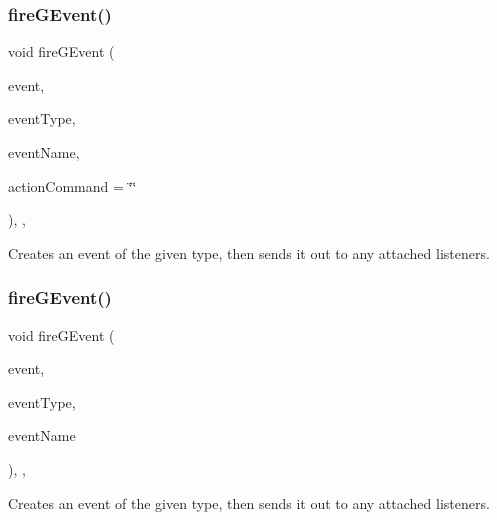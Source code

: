 \subsubsection{\texorpdfstring{fire\+G\+Event()}{fireGEvent()}\hspace{0.1cm}{\footnotesize\ttfamily [4/8]}}
{\footnotesize\ttfamily void fire\+G\+Event (\begin{DoxyParamCaption}\item[{Q\+Mouse\+Event $\ast$}]{event,  }\item[{Event\+Type}]{event\+Type,  }\item[{const std\+::string \&}]{event\+Name,  }\item[{const std\+::string \&}]{action\+Command = {\ttfamily \char`\"{}\char`\"{}} }\end{DoxyParamCaption})\hspace{0.3cm}{\ttfamily [protected]}, {\ttfamily [virtual]}, {\ttfamily [inherited]}}



Creates an event of the given type, then sends it out to any attached listeners. 

\mbox{\label{classGObservable_a63fd9034e1e1633c1c38eb342bfd34e9}} 
\subsubsection{\texorpdfstring{fire\+G\+Event()}{fireGEvent()}\hspace{0.1cm}{\footnotesize\ttfamily [5/8]}}
{\footnotesize\ttfamily void fire\+G\+Event (\begin{DoxyParamCaption}\item[{Q\+Resize\+Event $\ast$}]{event,  }\item[{Event\+Type}]{event\+Type,  }\item[{const std\+::string \&}]{event\+Name }\end{DoxyParamCaption})\hspace{0.3cm}{\ttfamily [protected]}, {\ttfamily [virtual]}, {\ttfamily [inherited]}}



Creates an event of the given type, then sends it out to any attached listeners. 

\mbox{\label{classGObservable_a741345310d9b7c5170a6cbc410c44ac4}} 
